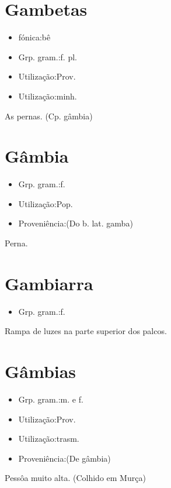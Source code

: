 \section{Gambetas}
\begin{itemize}
\item {fónica:bê}
\end{itemize}
\begin{itemize}
\item {Grp. gram.:f. pl.}
\end{itemize}
\begin{itemize}
\item {Utilização:Prov.}
\end{itemize}
\begin{itemize}
\item {Utilização:minh.}
\end{itemize}
As pernas.
(Cp. \textunderscore gâmbia\textunderscore )
\section{Gâmbia}
\begin{itemize}
\item {Grp. gram.:f.}
\end{itemize}
\begin{itemize}
\item {Utilização:Pop.}
\end{itemize}
\begin{itemize}
\item {Proveniência:(Do b. lat. \textunderscore gamba\textunderscore )}
\end{itemize}
Perna.
\section{Gambiarra}
\begin{itemize}
\item {Grp. gram.:f.}
\end{itemize}
Rampa de luzes na parte superior dos palcos.
\section{Gâmbias}
\begin{itemize}
\item {Grp. gram.:m.  e  f.}
\end{itemize}
\begin{itemize}
\item {Utilização:Prov.}
\end{itemize}
\begin{itemize}
\item {Utilização:trasm.}
\end{itemize}
\begin{itemize}
\item {Proveniência:(De \textunderscore gâmbia\textunderscore )}
\end{itemize}
Pessôa muito alta. (Colhido em Murça)
